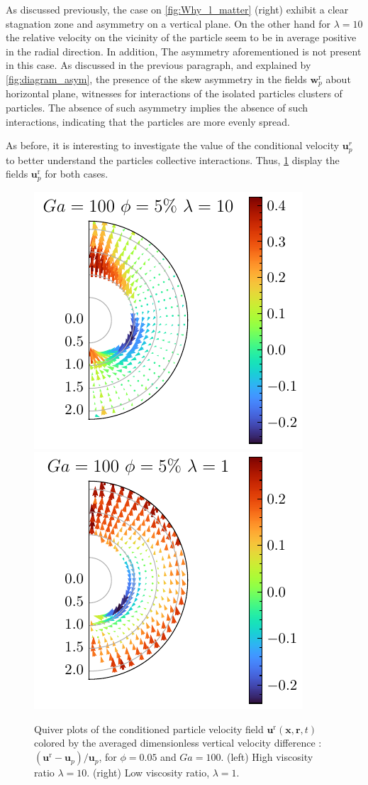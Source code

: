 As discussed previously, the case on \ref{fig:Why_l_matter} (right) exhibit a clear stagnation zone and asymmetry on a vertical plane. 
On the other hand for $\lambda =10$ the relative velocity on the vicinity of the particle seem to be in average positive in the radial direction. 
In addition, The asymmetry aforementioned is not present in this case. 
As discussed in the previous paragraph, and explained by \ref{fig:diagram_asym}, the presence of the skew asymmetry in the fields $\textbf{w}_p^\text{r}$ about horizontal plane, witnesses for interactions of the isolated particles clusters of particles.
The absence of such asymmetry implies the absence of such interactions, indicating that the particles are more evenly spread. 

As before, it is interesting to investigate the value of the conditional velocity $\textbf{u}^r_p$ to better understand the particles collective interactions. 
Thus, \ref{fig:unst_l} display the fields  $\textbf{u}_p^\text{r}$ for both cases. 
\begin{figure}[h!]
    \centering
    \includegraphics[height=0.35\textwidth]{image/HOMOGENEOUS_NEW/Dist/U_l_10_Ga_100_PHI_5.pdf}
    \includegraphics[height=0.35\textwidth]{image/HOMOGENEOUS_NEW/Dist/U_l_1_Ga_100_PHI_5.pdf}
    \caption{
         Quiver plots of the conditioned particle velocity field $\textbf{u}^\text{r}(\textbf{x},\textbf{r},t)$ colored by the averaged dimensionless vertical velocity difference : $(\textbf{u}^\text{r} - \textbf{u}_p )/ \textbf{u}_p$, for $\phi = 0.05$ and $Ga = 100$. 
         (left) High viscosity ratio $\lambda = 10$.
         (right) Low viscosity ratio, $\lambda = 1$.
         }
    \label{fig:unst_l}
\end{figure}

